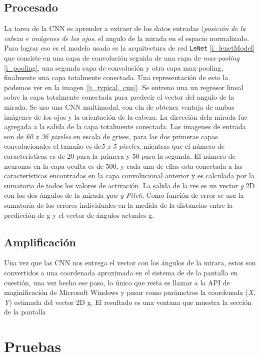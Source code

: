 \documentclass[12pt]{book} %
\begin{document}
	\subsection{Procesado}
		La tarea de la CNN es aprender a extraer de los datos entradas (\textit{posición de la cabeza e imágenes de los ojos}, el angulo de la
		mirada en el espacio normalizado.
		Para lograr eso es el modelo usado es la arquitectura de red \texttt{LeNet} \ref{i_lenetModel} que consiste en una capa de convolución 
		seguida de una capa 	de \textit{max-pooling} \ref{i_pooling}, una segunda capa de convolución y otra capa max-pooling, finalmente una 
		capa totalmente conectada.
		Una representación de esto la podemos ver en la imagen [\ref{i_typical_cnn}].
		Se entreno una un regresor lineal sobre la capa totalmente conectada para predecir el vector del angulo de la mirada. Se uso una 
		CNN multimodal, con eln de obtener ventaja de ambas imágenes de los ojos y la orientación de la cabeza.
		La dirección dela mirada fue agregada a la salida de la capa totalmente conectada.
		Las imagenes de entrada son de \textit{60 x 36 pixeles} en escala de grises, para las dos primeras capas convolucionales el tamaño
		es de\textit{5 x 5 pixeles}, mientras que el número de características es de 20 para la primera y 50 para la segunda. El número de 
		neuronas en la capa oculta es de 500, y cada una de ellas esta conectada a las características encontradas en la capa convolucional 
		anterior y es calculada por la sumatoria de todos los valores de activación. La salida de la res es un vector \textit{g} 2D 
		con los dos ángulos de la mirada \textit{yaw y Pitch}. Como función de error se usa la sumatoria de los errores individuales en la
		medida de la distancias entre la predicción de g y el vector de ángulos actuales g.
		
	\subsection{Amplificación}
		Una 	vez que las CNN nos entrega el vector con los ángulos de la mirara, estos son convertidos a una coordenada aproximada en 
		el sistema de de la pantalla en cuestión, una vez hecho ese paso, lo único que resta es llamar a la API de maginificación de 
		Microsoft Windows y pasar como parámetros la coordenada (\textit{X, Y}) estimada del vector 2D g.
		El resultado es una ventana que muestra la sección de la pantalla
	
\newpage	
\section{Pruebas}
	
\end{document}
